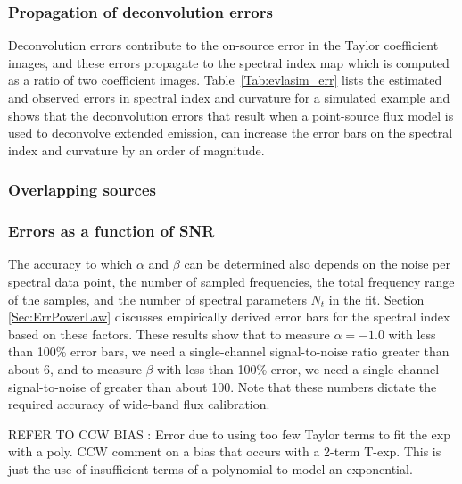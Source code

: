 \documentclass[structabstract]{stylefiles/aa}
\newcommand{\I}{{\vec{I}}}
\begin{document}
\subsubsection{Propagation of deconvolution errors}
Deconvolution errors contribute to the on-source error in the Taylor 
coefficient images, and these errors propagate to the spectral index map which  
is computed as a ratio of two coefficient images.
Table~\ref{Tab:evlasim_err} lists the estimated and observed errors in spectral index
and curvature for a simulated example and shows that the deconvolution errors that
result when a point-source flux model is used to deconvolve extended emission, 
can increase the error bars on the spectral index and curvature by an order of magnitude.
%

\subsubsection{Overlapping sources}

\subsubsection{Errors as a function of SNR}
The accuracy to which $\alpha$ and $\beta$ can be determined also
depends on the noise per spectral data point, the number of sampled frequencies,
the total frequency range of the samples, and the number of 
spectral parameters $N_t$ in the fit. Section \ref{Sec:ErrPowerLaw} discusses empirically 
derived error bars for the spectral index based on these factors.
These results show that to measure $\alpha=-1.0$ with less than 100\% error bars, we
need a single-channel signal-to-noise ratio greater than about 6, and to measure
$\beta$ with less than 100\% error, we need a single-channel signal-to-noise of 
greater than about 100.  
%
Note that these numbers dictate the required accuracy of wide-band flux calibration.


REFER TO CCW BIAS : Error due to using too few Taylor terms to fit the exp with a poly.
CCW comment on a bias that occurs with a 2-term T-exp. This is just the use of insufficient terms of a polynomial to model an exponential.
\end{document}
